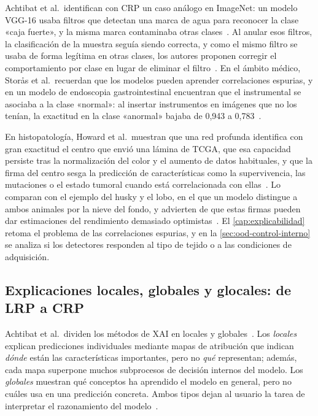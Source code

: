 Achtibat et al.\ identifican con CRP un caso análogo en ImageNet: un modelo VGG-16
usaba filtros que detectan una marca de agua para reconocer la clase «caja
fuerte», y la misma marca contaminaba otras clases~\cite{achtibat2023}. Al anular
esos filtros, la clasificación de la muestra seguía siendo correcta, y como el
mismo filtro se usaba de forma legítima en otras clases, los autores proponen
corregir el comportamiento por clase en lugar de eliminar el
filtro~\cite{achtibat2023}. En el ámbito médico, Storås et al.\ recuerdan que los
modelos pueden aprender correlaciones espurias, y en un modelo de endoscopia
gastrointestinal encuentran que el instrumental se asociaba a la clase «normal»:
al insertar instrumentos en imágenes que no los tenían, la exactitud en la clase
«anormal» bajaba de 0,943 a 0,783~\cite{storas2025}.

En histopatología, Howard et al.\ muestran que una red profunda identifica con
gran exactitud el centro que envió una lámina de TCGA, que esa capacidad persiste
tras la normalización del color y el aumento de datos habituales, y que la firma
del centro sesga la predicción de características como la supervivencia, las
mutaciones o el estado tumoral cuando está correlacionada con
ellas~\cite{howard2021}. Lo comparan con el ejemplo del husky y el lobo, en el que
un modelo distingue a ambos animales por la nieve del fondo, y advierten de que
estas firmas pueden dar estimaciones del rendimiento demasiado
optimistas~\cite{howard2021}. El \cref{cap:explicabilidad} retoma el problema de
las correlaciones espurias, y en la \cref{sec:ood-control-interno} se analiza si
los detectores responden al tipo de tejido o a las condiciones de adquisición.

\subsection{Explicaciones locales, globales y glocales: de LRP a CRP}\label{sec:ea-crp}

Achtibat et al.\ dividen los métodos de XAI en locales y
globales~\cite{achtibat2023}. Los \emph{locales} explican predicciones
individuales mediante mapas de atribución que indican \emph{dónde} están las
características importantes, pero no \emph{qué} representan; además, cada mapa
superpone muchos subprocesos de decisión internos del modelo. Los \emph{globales}
muestran qué conceptos ha aprendido el modelo en general, pero no cuáles usa en
una predicción concreta. Ambos tipos dejan al usuario la tarea de interpretar el
razonamiento del modelo~\cite{achtibat2023}.

